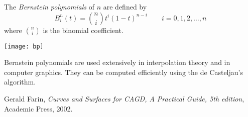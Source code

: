 \documentclass[12pt]{article}
\begin{document}
The \emph{Bernstein polynomials} of  $n$ are defined by
$$B_{i}^{n}(t)={n\choose i}t^i (1-t)^{n-i} \quad\quad i=0,1,2,\dots,n$$
where ${n\choose i}$ is the binomial coefficient.

\begin{center}
\texttt{[image: bp]}
\end{center}

Bernstein polynomials are used extensively in interpolation theory and in computer graphics. They can be computed efficiently using the de Casteljau's algorithm.

\begin{thebibliography}{9}
 Gerald Farin, \emph{Curves and Surfaces for CAGD, A Practical Guide, 5th edition},
Academic Press, 2002.
\end{thebibliography}
\end{document}

